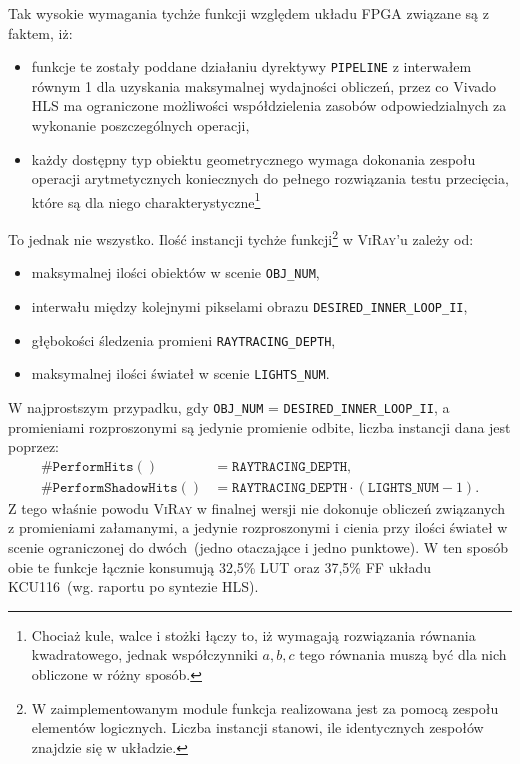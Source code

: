 \begin{enumerate}
Tak wysokie wymagania tychże funkcji względem układu FPGA związane są z faktem, iż:
\begin{itemize}
\item funkcje te zostały poddane działaniu dyrektywy \texttt{PIPELINE} z interwałem równym 1 dla uzyskania maksymalnej wydajności obliczeń, przez co Vivado HLS ma ograniczone możliwości współdzielenia zasobów odpowiedzialnych za wykonanie poszczególnych operacji,
\item każdy dostępny typ obiektu geometrycznego wymaga dokonania zespołu operacji arytmetycznych koniecznych do pełnego rozwiązania testu przecięcia, które są dla niego charakterystyczne\footnote{Chociaż kule, walce i stożki łączy to, iż wymagają rozwiązania równania kwadratowego, jednak współczynniki $a, b, c$ tego równania muszą być dla nich obliczone w różny sposób.}
\end{itemize}
To jednak nie wszystko. Ilość instancji tychże funkcji\footnote{W zaimplementowanym module funkcja realizowana jest za pomocą zespołu elementów logicznych. Liczba instancji stanowi, ile identycznych zespołów znajdzie się w układzie.} w \textsc{ViRay}'u zależy od:
\begin{itemize}
\item maksymalnej ilości obiektów w scenie \texttt{OBJ\_NUM},
\item interwału między kolejnymi pikselami obrazu \texttt{DESIRED\_INNER\_LOOP\_II},
\item głębokości śledzenia promieni \texttt{RAYTRACING\_DEPTH},
\item maksymalnej ilości świateł w scenie \texttt{LIGHTS\_NUM}.
\end{itemize}
W najprostszym przypadku, gdy \texttt{OBJ\_NUM} = \texttt{DESIRED\_INNER\_LOOP\_II}, a promieniami rozproszonymi są jedynie promienie odbite, liczba instancji dana jest poprzez:
\begin{align*}
\#\mathtt{PerformHits()} &= \mathtt{RAYTRACING\_DEPTH},\\
\#\mathtt{PerformShadowHits()} &= \mathtt{RAYTRACING\_DEPTH} \cdot \left(\mathtt{LIGHTS\_NUM} - 1\right).
\end{align*}
Z tego właśnie powodu \textsc{ViRay} w finalnej wersji nie dokonuje obliczeń związanych z promieniami załamanymi, a jedynie rozproszonymi i cienia przy ilości świateł w scenie ograniczonej do dwóch~(jedno otaczające i jedno punktowe). W ten sposób obie te funkcje łącznie konsumują 32,5\% LUT oraz 37,5\% FF układu KCU116~(wg. raportu po syntezie HLS). 


\end{enumerate}
